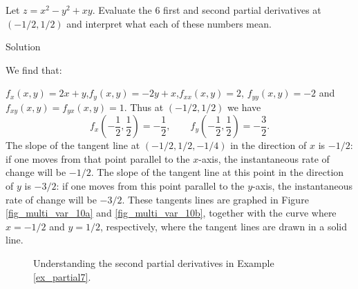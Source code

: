 \begin{example}\label{ex_partial7}
Let $z=x^2-y^2+xy$. Evaluate the 6 first and second partial derivatives at $(-1/2,1/2)$ and interpret what each of these numbers mean.

\ifanalysis\pagebreak\fi
{}Solution 

We find that:

$f_x(x,y) = 2x+y$,\quad  $f_y(x,y) = -2y+x$,\quad $f_{xx}(x,y) = 2$, \quad $f_{yy}(x,y) = -2$ and $f_{xy}(x,y) = f_{yx}(x,y) = 1$. Thus at $(-1/2,1/2)$ we have 
$$f_x\left(-\dfrac{1}{2},\dfrac{1}{2}\right) = -\dfrac{1}{2},\qquad f_y\left(-\dfrac{1}{2},\dfrac{1}{2}\right) = -\dfrac{3}{2}.$$
The slope of the tangent line at $(-1/2, 1/2, -1/4)$ in the direction of $x$ is $-1/2$: if one moves from that point parallel to the $x$-axis, the instantaneous rate of change will be $-1/2$. The slope of the tangent line
 at this point in the direction of $y$ is $-3/2$: if one moves from this point parallel to the $y$-axis, the instantaneous rate of change will be $-3/2$. These tangents lines are graphed in Figure \ref{fig_multi_var_10a} and \ref{fig_multi_var_10b}, together with the curve where $x=-1/2$ and $y=1/2$, respectively, where the tangent lines are drawn in a solid line. 

\begin{figure}[H]
\centering
\qquad
{}
\caption{Understanding the second partial derivatives in Example \ref{ex_partial7}.}
\end{figure}



\end{example}
